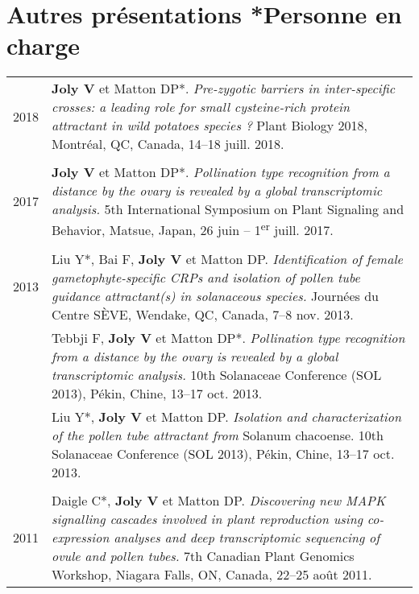 \documentclass[letterpaper,10pt]{article}
\begin{document}
\bigskip
\bigskip

\section[Autres présentations]{Autres présentations
                               \hfill \small{*Personne en charge}}
\begin{tabular}{r|p{15.1cm}}

2018

& \textbf{Joly V} et Matton DP*.
  \emph{Pre-zygotic barriers in inter-specific crosses: a leading role for small
  cysteine-rich protein attractant in wild potatoes species ?}
  Plant Biology 2018, Montréal, QC, Canada, 14--18 juill. 2018.
  \\

\multicolumn{2}{c}{} \\

2017

& \textbf{Joly V} et Matton DP*.
  \emph{Pollination type recognition from a distance by the ovary is revealed
  by a global transcriptomic analysis.}
  5th International Symposium on Plant Signaling and Behavior, Matsue, Japan,
  26 juin -- 1\textsuperscript{er} juill. 2017.
  \\

\multicolumn{2}{c}{} \\

2013

& Liu Y*, Bai F, \textbf{Joly V} et Matton DP.
  \emph{Identification of female gametophyte-specific CRPs and isolation of
  pollen tube guidance attractant(s) in solanaceous species.}
  Journées du Centre SÈVE, Wendake, QC, Canada, 7--8 nov. 2013.
  \vspace{1.5mm} \\

& Tebbji F, \textbf{Joly V} et Matton DP*. \emph{Pollination type recognition
  from a distance by the ovary is revealed by a global transcriptomic analysis.}
  10th Solanaceae Conference (SOL 2013), Pékin, Chine, 13--17 oct. 2013.
  \vspace{1.5mm} \\


& Liu Y*, \textbf{Joly V} et Matton DP.
  \emph{Isolation and characterization of the pollen tube attractant from}
  Solanum chacoense. 10th Solanaceae Conference (SOL 2013), Pékin, Chine,
  13--17 oct. 2013. \\

\multicolumn{2}{c}{} \\

2011

& Daigle C*, \textbf{Joly V} et Matton DP.
  \emph{Discovering new MAPK signalling cascades involved in plant reproduction
  using co-expression analyses and deep transcriptomic sequencing of ovule
  and pollen tubes.}
  7th Canadian Plant Genomics Workshop, Niagara Falls, ON, Canada,
  22--25 août 2011.
  \\

\end{tabular}
\end{document}
